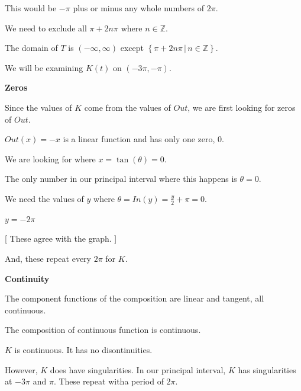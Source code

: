 \documentclass{ximera}
\begin{document}
{{This would be $-\pi$ plus or minus any whole numbers of $2\pi$.

We need to exclude  all $\pi + 2n\pi$ where $n \in \mathbb{Z}$. 




The domain of $T$ is $(-\infty, \infty)$ except $\left\{  \pi + 2n\pi \, | \,   n \in \mathbb{Z}  \right\}$. 




We will be examining $K(t)$ on $(-3\pi, -\pi)$. 














\textbf{\textcolor{blue!55!black}{Zeros}}


Since the values of $K$ come from the values of $Out$, we are first looking for zeros of $Out$.  

$Out(x) = -x$ is a linear function and has only one zero, $0$. 

We are looking for where $x = \tan(\theta) = 0$. 


The only number in our principal interval where this happens is $\theta = 0$. 



We need the values of $y$ where $\theta = In(y) = \frac{y}{2} + \pi = 0$. 


$y = -2\pi$  

[ These agree with the graph. ]


And, these repeat every $2\pi$ for $K$.




















\textbf{\textcolor{blue!55!black}{Continuity}}


The component functions of the composition are linear and tangent, all continuous. 

The composition of continuous function is continuous.

$K$ is continuous. It has no disontinuities. 


However, $K$ does have singularities. In our principal interval, $K$ has singularities at $-3\pi$ and $\pi$.  These repeat witha period of $2\pi$.


}}
\end{document}
